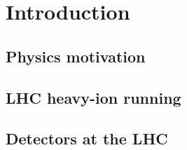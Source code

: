 \section{Introduction}
\label{secall:intro}
\subsection{Physics motivation}
\label{subsecall:motivation}
\subsection{LHC heavy-ion running}
\label{subsecall:running}
\subsection{Detectors at the LHC}
\label{subsecall:detectors}
